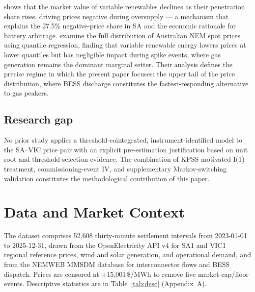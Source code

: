 \documentclass[12pt,a4paper]{article}
\begin{document}
\textcite{hirth2013market} shows that the market value of variable renewables
declines as their penetration share rises, driving prices negative during
oversupply --- a mechanism that explains the 27.5\% negative-price share in SA
and the economic rationale for battery arbitrage.
\textcite{mwampashi2025beyond} examine the full distribution of Australian NEM
spot prices using quantile regression, finding that variable renewable energy
lowers prices at lower quantiles but has negligible impact during spike events,
where gas generation remains the dominant marginal setter.  Their analysis
defines the precise regime in which the present paper focuses: the upper tail of
the price distribution, where BESS discharge constitutes the fastest-responding
alternative to gas peakers.

\subsection*{Research gap}

No prior study applies a threshold-cointegrated, instrument-identified model to
the SA--VIC price pair with an explicit pre-estimation justification based on
unit root and threshold-selection evidence.  The combination of KPSS-motivated
I(1) treatment, commissioning-event IV, and supplementary Markov-switching
validation constitutes the methodological contribution of this paper.

\section{Data and Market Context}
\label{sec:data}

The dataset comprises 52{,}608 thirty-minute settlement intervals from
2023-01-01 to 2025-12-31, drawn from the OpenElectricity API v4 for SA1 and
VIC1 regional reference prices, wind and solar generation, and operational
demand, and from the NEMWEB MMSDM database for interconnector flows and BESS
dispatch.  Prices are censored at $\pm$15{,}001\,\$/MWh to remove five
market-cap/floor events.  Descriptive statistics are in Table~\ref{tab:desc}
(Appendix~A).
\end{document}
